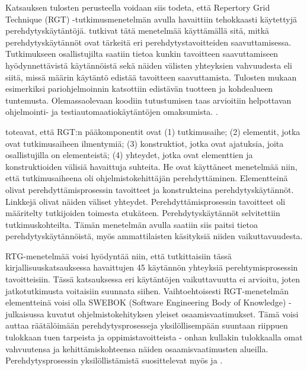 \documentclass[utf8]{gradu3}
\begin{document}
Katsauksen tulosten perusteella voidaan siis todeta, että Repertory Grid Technique (RGT) -tutkimusmenetelmän avulla havaittiin tehokkaasti käytettyjä perehdytyskäytäntöjä. \textcite{buchan-ym-2019} tutkivat tätä menetelmää käyttämällä sitä, mitkä perehdytyskäytännöt ovat tärkeitä eri perehdytystavoitteiden saavuttamisessa. Tutkimukseen osallistujilta saatiin tietoa kunkin tavoitteen saavuttamiseen hyödynnettävistä käytännöistä sekä näiden välisten yhteyksien vahvuudesta eli siitä, missä määrin käytäntö edistää tavoitteen saavuttamista. Tulosten mukaan esimerkiksi pariohjelmoinnin katsottiin edistävän tuotteen ja kohdealueen tuntemusta. Olemassaolevaan koodiin tutustumisen taas arvioitiin helpottavan ohjelmointi- ja testiautomaatiokäytäntöjen omaksumista. \parencite{buchan-ym-2019}.

\textcite{buchan-ym-2019} toteavat, että RGT:n pääkomponentit ovat (1) tutkimusaihe; (2) elementit, jotka ovat tutkimusaiheen ilmentymiä; (3) konstruktiot, jotka ovat ajatuksia, joita osallistujilla on elementeistä; (4) yhteydet, jotka ovat elementtien ja konstruktioiden välisiä havaittuja suhteita. He ovat  käyttäneet menetelmää niin, että tutkimusaiheena oli ohjelmistokehittäjän perehdyttäminen. Elementteinä olivat perehdyttämisprosessin tavoitteet ja konstrukteina perehdytyskäytännöt. Linkkejä olivat näiden väliset yhteydet. Perehdyttämisprosessin tavoitteet oli määritelty tutkijoiden toimesta etukäteen. Perehdytyskäytännöt selvitettiin tutkimuskohteilta. Tämän menetelmän avulla saatiin siis paitsi tietoa perehdytyskäytännöistä, myös ammattilaisten käsityksiä niiden vaikuttavuudesta. 

RTG-menetelmää voisi hyödyntää niin, että tutkittaisiin tässä kirjallisuuskatsauksessa havaittujen 45 käytännön yhteyksiä perehtymisprosessin tavoitteisiin. Tässä katsauksessa eri käytäntöjen vaikuttavuutta ei arvioitu, joten jatkotutkimusta voitaisiin suunnata siihen. Vaihtoehtoisesti RGT-menetelmän elementteinä voisi olla SWEBOK (Software Engineering Body of Knowledge) -julkaisussa \parencite{swebok} kuvatut ohjelmistokehityksen yleiset osaamisvaatimukset. Tämä voisi auttaa räätälöimään perehdytysprosesseja yksilöllisempään suuntaan riippuen tulokkaan tuen tarpeista ja oppimistavoitteista - onhan kullakin tulokkaalla omat vahvuutensa ja kehittämiskohteensa näiden osaamisvaatimusten alueilla. Perehdytysprosessin yksilöllistämistä suosittelevat myös \textcite{britto-ym-2017} ja \textcite{rodeghero-ym-2021}.


\end{document}
